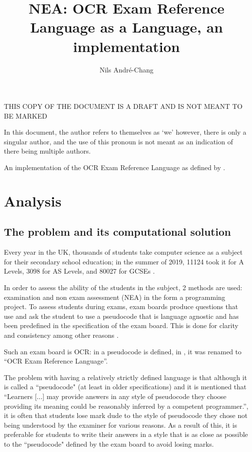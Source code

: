 \documentclass{article}
\author{Nils André-Chang}
\title{NEA: OCR Exam Reference Language as a Language, an implementation}
\begin{document}
{\huge THIS COPY OF THE DOCUMENT IS A DRAFT AND IS NOT MEANT TO BE MARKED}

\maketitle

\tableofcontents

In this document, the author refers to themselves as `we' however, there is
only a singular author, and the use of this pronoun is not meant as an
indication of there being multiple authors.

An implementation of the OCR Exam Reference Language as defined by
\textcite{j277, h446}.

\section{Analysis}

\subsection{The problem and its computational solution}

Every year in the UK, thousands of students take computer science as a subject
for their secondary school education; in the summer of 2019, 11124 took it for
A Levels, 3098 for AS Levels, and 80027 for GCSEs
\cite{jcqalevel19, jcqgcse19}.

In order to assess the ability of the students in the subject, 2 methods are
used: examination and non exam assessment (NEA) in the form a programming
project. To assess students during exams, exam boards produce questions that
use and ask the student to use a pseudocode that is language agnostic and has
been predefined in the specification of the exam board.  This is done for
clarity and consistency among other reasons \cite{h446, j276, j277}.

Such an exam board is OCR: in \textcite{h446, j276, j277} a pseudocode is
defined, in \textcite{j277}, it was renamed to ``OCR Exam Reference Language''.

The problem with having a relatively strictly defined language is that although
it is called a ``pseudocode" (at least in older specifications) and it is
mentioned that ``Learners [...] may provide answers in any style of pseudocode
they choose providing its meaning could be reasonably inferred by a competent
programmer.'', it is often that students lose mark dude to the style of
pseudocode they chose not being understood by the examiner for various reasons.
As a result of this, it is preferable for students to write their answers in a
style that is as close as possible to the ``pseudocode" defined by the exam
board to avoid losing marks.
\end{document}
